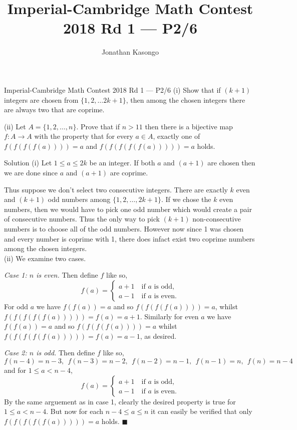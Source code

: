 \documentclass{article}
\author{Jonathan Kasongo}
\title{Imperial-Cambridge Math Contest 2018 Rd 1 --- P2/6}
\begin{document}
\maketitle

\begin{problem}{Imperial-Cambridge Math Contest 2018 Rd 1 --- P2/6}
(i) Show that if $(k+1)$ integers are chosen from $\{1, 2, \ldots 2k+1\}$,
then among the chosen integers there are always two that are coprime.
\vspace{0.2cm}

(ii) Let $A = \{1,2,\ldots, n\}$. Prove that if $n > 11$ then there is a
bijective map $f : A \rightarrow A$ with the property that for every
$a \in A$, exactly one of $f(f(f(f(a)))) = a$ and
$f(f(f(f(f(a))))) = a$ holds.
\end{problem}

\begin{solution}{Solution}
(i) Let $1 \leq a \leq 2k$ be an integer. If both $a$ and $(a+1)$ are chosen
then we are done since $a$ and $(a+1)$ are coprime. \vspace{0.2cm}

Thus suppose we don't select two consecutive integers. There are exactly
$k$ even and $(k+1)$ odd numbers among $\{1,2,\ldots, 2k+1\}$. If we chose
the $k$ even numbers, then we would have to pick one odd number which would
create a pair of consecutive numbers. Thus the only way to pick $(k+1)$
non-consecutive numbers is to choose all of the odd numbers. However now
since 1 was chosen and every number is coprime with 1, there does infact
exist two coprime numbers among the chosen integers. \\

(ii) We examine two cases. \vspace{0.2cm}

\textit{Case 1: $n$ is even.} Then define $f$ like so,
$$
f(a) =
\begin{cases}
a+1 \quad \text{if } a \text{ is odd},\\
a-1 \quad \text{if } a \text{ is even}.
\end{cases}
$$
For odd $a$ we have $f(f(a)) = a$ and so $f(f(f(f(a)))) = a$,
whilst $f(f(f(f(f(a))))) = f(a) = a+1$. Similarly for even $a$ we have
$f(f(a)) = a$ and so $f(f(f(f(a)))) = a$ whilst
$f(f(f(f(f(a))))) = f(a) = a-1$, as desired.\vspace{0.2cm}

\textit{Case 2: $n$ is odd.} Then define $f$ like so,
$$
f(n-4) = n-3, \ \  f(n-3) = n-2, \ \ f(n-2) = n-1, \ \ f(n-1) = n, \ \
f(n) = n-4
$$
and for $1 \leq a < n-4$,
$$
f(a) =
\begin{cases}
a+1 \quad \text{if } a \text{ is odd},\\
a-1 \quad \text{if } a \text{ is even}.
\end{cases}
$$
By the same arguement as in case 1, clearly the desired property is true
for $1 \leq a < n-4$. But now for each $n-4 \leq a \leq n$ it can easily
be verified that only $f(f(f(f(f(a))))) = a$ holds. $\blacksquare$
\end{solution}
\end{document}
